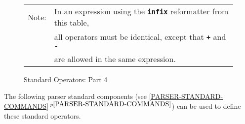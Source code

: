 \documentclass[12pt]{article}
\newcommand{\TT}[1]{{\tt \bfseries #1}}
\newcommand{\itemref}[1]{\ref{#1}$\,^{p\pageref{#1}}$}
\begin{document}
\begin{figure*}[!p]
\begin{center}
\medskip

\begin{tabular}{ll}
Note: & In an expression using the \TT{infix}
        \underline{reformatter} from this table, \\
      & all operators must be identical, except that \TT{+} and \TT{-} \\
      & are allowed in the same expression. \\
\end{tabular}

\end{center}
\caption{Standard Operators: Part 4}
\label{STANDARD-OPERATORS-4}
\end{figure*}

\clearpage

The following parser standard components
(see \itemref{PARSER-STANDARD-COMMANDS})
can be used to define these standard operators.
\end{document}
